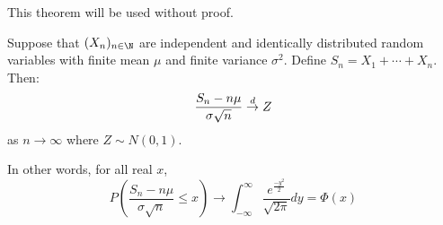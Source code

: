 \documentclass[../Main.tex]{subfiles}
\begin{document}
This theorem will be used without proof.
\begin{theorem}
    Suppose that $(X_n)_{n \in \N}$ are independent and identically distributed random variables with finite mean $\mu$ and finite variance $\sigma^2$. Define $S_n = X_1 + \cdots + X_n$. Then:
    \begin{equation*}
        \frac{S_n - n\mu}{\sigma\sqrt{n}} \overset{d}{\rightarrow} Z
    \end{equation*}
    as $n \to \infty$ where $Z \sim N(0, 1)$.

    In other words, for all real $x$,
    \begin{equation*}
        P\left(\frac{S_n - n\mu}{\sigma\sqrt{n}}\leq x\right) \to \int_{-\infty}^\infty \frac{e^\frac{-y^2}{2}}{\sqrt{2\pi}} dy = \Phi(x)
    \end{equation*}
    \label{thmCentralLimit}
\end{theorem}
\end{document}
